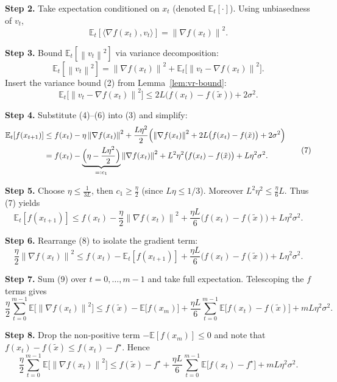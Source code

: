 \documentclass{article}
\newcommand{\EE}{\mathbb{E}}
\newcommand{\norm}[1]{\left\|#1\right\|}
\newcommand{\grad}{\nabla}
\begin{document}
\medskip
\noindent\textbf{Step 2.} Take expectation conditioned on $x_t$ (denoted $\EE_t[\cdot]$). Using unbiasedness of $v_t$,
\[
\EE_t[\langle\grad f(x_t),v_t\rangle]=\norm{\grad f(x_t)}^2 .
\tag{4}
\]

\medskip
\noindent\textbf{Step 3.} Bound $\EE_t[\norm{v_t}^2]$ via variance decomposition:
\[
\EE_t[\norm{v_t}^2]=\norm{\grad f(x_t)}^2+\EE_t\!\bigl[\norm{v_t-\grad f(x_t)}^2\bigr].
\tag{5}
\]
Insert the variance bound (2) from Lemma~\ref{lem:vr-bound}:
\[
\EE_t\!\bigl[\norm{v_t-\grad f(x_t)}^2\bigr]\le 2L\bigl(f(x_t)-f(\tilde{x})\bigr)+2\sigma^2 .
\tag{6}
\]

\medskip
\noindent\textbf{Step 4.} Substitute (4)–(6) into (3) and simplify:
\[
\begin{aligned}
\EE_t[f(x_{t+1})]
&\le f(x_t)-\eta\norm{\grad f(x_t)}^2
      +\frac{L\eta^2}{2}\Bigl(\norm{\grad f(x_t)}^2+2L\bigl(f(x_t)-f(\tilde{x})\bigr)+2\sigma^2\Bigr)\\
&= f(x_t)-\underbrace{\Bigl(\eta-\frac{L\eta^2}{2}\Bigr)}_{=:c_1}\norm{\grad f(x_t)}^2
   +L^2\eta^2\bigl(f(x_t)-f(\tilde{x})\bigr)+L\eta^2\sigma^2 .
\end{aligned}
\tag{7}
\]

\medskip
\noindent\textbf{Step 5.} Choose $\eta\le \frac{1}{3L}$, then $c_1\ge \frac{\eta}{2}$ (since $L\eta\le 1/3$). Moreover $L^2\eta^2\le \frac{\eta}{6}L$.
Thus (7) yields
\[
\EE_t[f(x_{t+1})]\le f(x_t)-\frac{\eta}{2}\norm{\grad f(x_t)}^2
                +\frac{\eta L}{6}\bigl(f(x_t)-f(\tilde{x})\bigr)+L\eta^2\sigma^2 .
\tag{8}
\]

\medskip
\noindent\textbf{Step 6.} Rearrange (8) to isolate the gradient term:
\[
\frac{\eta}{2}\norm{\grad f(x_t)}^2
\le f(x_t)-\EE_t[f(x_{t+1})]
   +\frac{\eta L}{6}\bigl(f(x_t)-f(\tilde{x})\bigr)+L\eta^2\sigma^2 .
\tag{9}
\]

\medskip
\noindent\textbf{Step 7.} Sum (9) over $t=0,\dots,m-1$ and take full expectation. Telescoping the $f$ terms gives
\[
\frac{\eta}{2}\sum_{t=0}^{m-1}\EE\!\bigl[\norm{\grad f(x_t)}^2\bigr]
\le f(\tilde{x})- \EE\!\bigl[f(x_{m})\bigr]
   +\frac{\eta L}{6}\sum_{t=0}^{m-1}\EE\!\bigl[f(x_t)-f(\tilde{x})\bigr]
   +mL\eta^2\sigma^2 .
\tag{10}
\]

\medskip
\noindent\textbf{Step 8.} Drop the non‑positive term $- \EE[f(x_m)]\le 0$ and note that $f(x_t)-f(\tilde{x})\le f(x_t)-f^\star$. Hence
\[
\frac{\eta}{2}\sum_{t=0}^{m-1}\EE\!\bigl[\norm{\grad f(x_t)}^2\bigr]
\le f(\tilde{x})-f^\star
   +\frac{\eta L}{6}\sum_{t=0}^{m-1}\EE\!\bigl[f(x_t)-f^\star\bigr]
   +mL\eta^2\sigma^2 .
\tag{11}
\]
\end{document}
